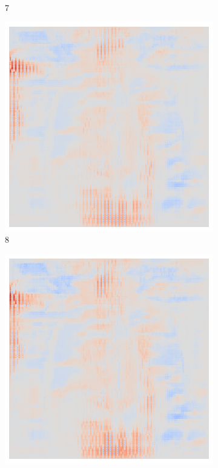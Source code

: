 \begin{figure}[ht!]
\begin{subfigure}{0.095\linewidth}
        \caption{7}
    \end{subfigure}\hfill%
    \begin{subfigure}{0.095\linewidth}
        \centering
        \includegraphics[height=1\linewidth]{01-images/05-resultate/uap_efficientnet/uap0-efficientnetv2m-covid-n200-robustificationslevel8.png}
        \caption{8}
    \end{subfigure}\hfill%
    \begin{subfigure}{0.095\linewidth}
        \centering
        \includegraphics[height=1\linewidth]{01-images/05-resultate/uap_efficientnet/uap0-efficientnetv2m-covid-n200-robustificationslevel9.png}

\end{subfigure}
\end{figure}
